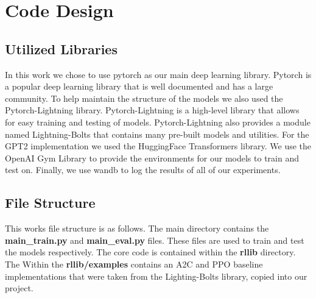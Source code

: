 
\section{Code Design}

\subsection{Utilized Libraries}
In this work we chose to use pytorch as our main deep learning library. Pytorch is a popular deep learning library that is well documented and has a large community.
To help maintain the structure of the models we also used the Pytorch-Lightning library. 
Pytorch-Lightning is a high-level library that allows for easy training and testing of models.
Pytorch-Lightning also provides a module named Lightning-Bolts that contains many pre-built models and utilities.
For the GPT2 implementation we used the HuggingFace Transformers library.
We use the OpenAI Gym Library to provide the environments for our models to train and test on\cite{brockman2016openai}.
Finally, we use wandb to log the results of all of our experiments\cite{wandb}.

\subsection{File Structure}

This works file structure is as follows. The main directory contains the \textbf{main\_train.py} and \textbf{main\_eval.py} files. 
These files are used to train and test the models respectively. The core code is contained within the \textbf{rllib} directory. 
The Within the \textbf{rllib/examples} contains an A2C and PPO baseline implementations that were taken from the Lighting-Bolts library, 
copied into our project. 

